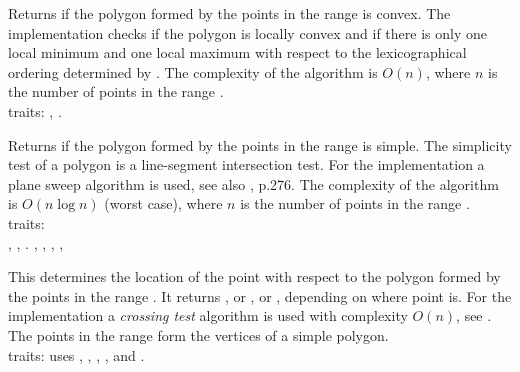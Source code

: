 {
Returns  if the polygon formed by the points in the range
\ccStyle{[first,last)} is convex.
The implementation checks if the polygon is locally convex
and if there is only one local minimum and one local maximum with respect to
the lexicographical ordering determined by
.
The complexity of the algorithm is $O(n)$, where $n$ is the number of points
in the range \ccStyle{[first,last)}.\\
{\sc traits}: ,
                   .
}


{\samepage
{}
{
Returns  if the polygon formed by the points in the range
\ccStyle{[first,last)} is simple.
The simplicity test of a polygon is a line-segment intersection test.
For the implementation a plane sweep algorithm is used, see also 
\cite{ps-cgi-85}, p.276.
The complexity of the algorithm is $O(n \log n)$ (worst case), where $n$ is 
the number of points in the range \ccStyle{[first,last)}.\\
{\sc traits}:\\ 
  , \quad
  ,
  .
  ,
  ,
  ,
  ,
}
} 

{
This determines the location of the point  with respect to the 
polygon formed by the points in the range \ccStyle{[first,last)}.
It returns , or , or 
, depending on where point  is.
For the implementation a {\em crossing test} algorithm is used with complexity
$O(n)$, see \cite{h-pps-94}.
\ccPrecond The points in the range \ccStyle{[first,last)}
form the vertices of a simple polygon.\\
{\sc traits}: uses ,
                   ,
                   ,
                   ,
                    and
                   .
}

